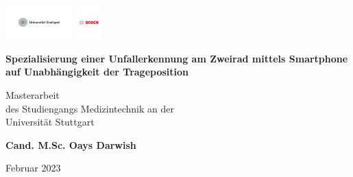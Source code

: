 \relax
\begin{center}
	\begin{center}
		\includegraphics[height=1.3cm]{Bilder/Logos/unistuttgart_logo_deutsch2.pdf} \hfill \includegraphics[height=1.3cm]{Bilder/Logos/BoschLogotype2.pdf}
	\end{center}
	\vspace*{3.5cm} 
	\begin{center}
		\LARGE\textbf{Spezialisierung einer Unfallerkennung am Zweirad mittels Smartphone auf Unabhängigkeit der Trageposition}
	\end{center}
	\vspace{1.5cm}
	
	
	\begin{center}
		Masterarbeit\\
		des Studiengangs Medizintechnik an der\\
		Universität Stuttgart
	\end{center}
	\vspace{2.8cm}
	\begin{center}
		\textbf{Cand. M.Sc. Oays Darwish} 
	\end{center}	
	
	\vspace{4.5cm}
	\begin{center}
		Februar 2023
	\end{center}	
	
\end{center}